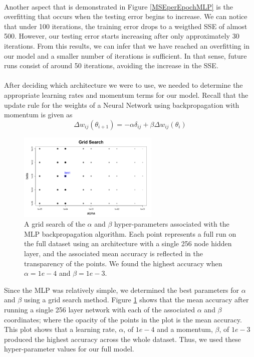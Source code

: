 \documentclass[11.5pt]{article}
\newcounter{Figure}
\newcounter{graphics}
\begin{document}
\paragraph{} Another aspect that is demonstrated in Figure \ref{MSEperEpochMLP} is the overfitting that occurs when the testing error begins to increase. We can notice that under 100 iterations, the training error drops to a weigthed SSE of almost 500. However, our testing error starts increasing after only approximately 30 iterations. From this results, we can infer that we have reached an overfitting in our model and a smaller number of iterations is sufficient. In that sense, future runs consist of around 50 iterations, avoiding the increase in the SSE.

\paragraph{} After deciding which architecture we were to use, we needed to determine the appropriate learning rates and momentum terms for our model. Recall that the update rule for the weights of a Neural Network using backpropagation with momentum is given as 
$$ \Delta w_{ij} (\theta_{i+1}) = -\alpha \delta_{ij}  + \beta \Delta w_{ij} (\theta_i)$$


  \begin{figure}[h!]
\centerline{\includegraphics[width=0.6\textwidth]{report_mlp/GridSearch.png}}
  \caption{\small A grid search of the $\alpha$ and $\beta$ hyper-parameters associated with the MLP backpropagation algorithm. Each point represents a full run on the full dataset using an architecture with a single 256 node hidden layer, and the associated mean accuracy is reflected in the transparency of the points. We found the highest accuracy when $\alpha = 1e-4$ and $\beta =1e-3$. }
\label{GridSearch}
\end{figure}

Since the MLP was relatively simple, we determined the best parameters for $\alpha$ and $\beta$ using a grid search method. Figure \ref{GridSearch} shows that the mean accuracy after running a single 256 layer network with each of the associated $\alpha$ and $\beta$ coordinates; where the opacity of the points in the plot is the mean accuracy. This plot shows that a learning rate, $\alpha$, of $1e-4$ and a momentum, $\beta$, of $1e-3$ produced the highest accuracy across the whole dataset. Thus, we used these hyper-parameter values for our full model. 
\end{document}
